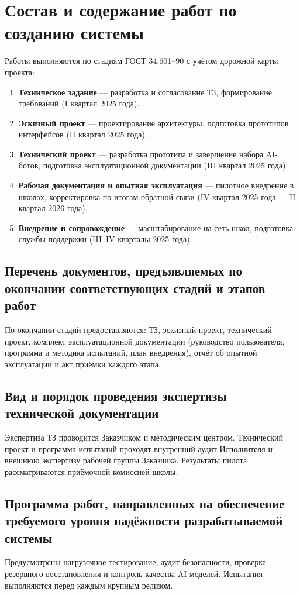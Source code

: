 \documentclass[14pt,a4paper]{extarticle}
\begin{document}
\section{Состав и содержание работ по созданию системы}
Работы выполняются по стадиям ГОСТ 34.601–90 с учётом дорожной карты проекта:
\begin{enumerate}
  \item \textbf{Техническое задание} — разработка и согласование ТЗ, формирование требований (I квартал 2025 года).
  \item \textbf{Эскизный проект} — проектирование архитектуры, подготовка прототипов интерфейсов (II квартал 2025 года).
  \item \textbf{Технический проект} — разработка прототипа и завершение набора AI-ботов, подготовка эксплуатационной документации (III квартал 2025 года).
  \item \textbf{Рабочая документация и опытная эксплуатация} — пилотное внедрение в школах, корректировка по итогам обратной связи (IV квартал 2025 года — II квартал 2026 года).
  \item \textbf{Внедрение и сопровождение} — масштабирование на сеть школ, подготовка службы поддержки (III–IV кварталы 2025 года).
\end{enumerate}

\subsection{Перечень документов, предъявляемых по окончании соответствующих стадий и этапов работ}
По окончании стадий предоставляются: ТЗ, эскизный проект, технический проект, комплект эксплуатационной документации (руководство пользователя, программа и методика испытаний, план внедрения), отчёт об опытной эксплуатации и акт приёмки каждого этапа.

\subsection{Вид и порядок проведения экспертизы технической документации}
Экспертиза ТЗ проводится Заказчиком и методическим центром. Технический проект и программа испытаний проходят внутренний аудит Исполнителя и внешнюю экспертизу рабочей группы Заказчика. Результаты пилота рассматриваются приёмочной комиссией школы.

\subsection{Программа работ, направленных на обеспечение требуемого уровня надёжности разрабатываемой системы}
Предусмотрены нагрузочное тестирование, аудит безопасности, проверка резервного восстановления и контроль качества AI-моделей. Испытания выполняются перед каждым крупным релизом.
\end{document}
